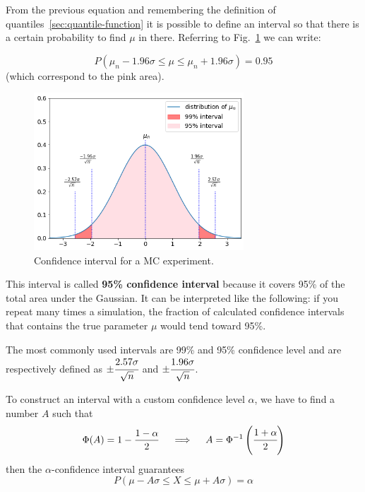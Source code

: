 From the previous equation and remembering the definition of quantiles~\ref{sec:quantile-function} it is possible to define an interval so that there is a certain probability to find $\mu$ in there. Referring to Fig.~\ref{fig:confidence_interval} we can write:

\begin{equation}
P\left(\mu_n - 1.96\sigma\le \mu \le \mu_n + 1.96\sigma\right) = 0.95
\end{equation}
(which correspond to the pink area).

\begin{figure}[htb]
\centering
\includegraphics[width=0.7\textwidth]{figures/confidence_interval}
\caption{Confidence interval for a MC experiment.}
\label{fig:confidence_interval}
\end{figure}

This interval is called \textbf{95\% confidence interval} because it covers 95\% of the total area under the Gaussian. It can be interpreted like the following: if you repeat many times a simulation, the fraction of calculated confidence intervals that contains the true parameter $\mu$ would tend toward 95\%.

The most commonly used intervals are 99\% and 95\% confidence level and are respectively defined as \(\pm \cfrac{2.57\sigma}{\sqrt{n}}\) and \(\pm \cfrac{1.96\sigma}{\sqrt{n}}\).

To construct an interval with a custom confidence level $\alpha$, we have to find a number $A$ such that
\begin{equation}
\Phi(A) = 1 - \frac{1-\alpha}{2}\quad\implies\quad A = \Phi^{-1}\left(\cfrac{1+\alpha}{2}\right)
\label{for:A}
\end{equation}
then the $\alpha$-confidence interval guarantees
\begin{equation}
P(\mu - A\sigma \le X \le \mu+ A\sigma) = \alpha 
\end{equation}

